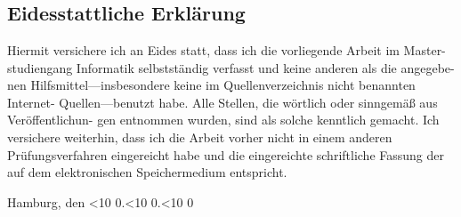 \documentclass[
    12pt,
    a4paper,
    BCOR=10mm,
    DIV=14,
    listof=totoc,
    bibliography=totoc,
    headsepline
]{scrbook}
\newcommand{\leadingzero}[1]{\ifnum #1<10 0\the#1\else\the#1\fi}
\begin{document}






\tableofcontents                  %







\printbibliography%


\begingroup
\let\cleardoublepage\clearpage

\listoffigures
\listoftables
\lstlistoflistings%

\endgroup


\begin{appendices}

\end{appendices}

\newpage

\thispagestyle{empty}

\chapter*{}

\section*{Eidesstattliche Erklärung}

Hiermit versichere ich an Eides statt, dass ich die vorliegende Arbeit im Master-
studiengang Informatik selbstständig verfasst und keine anderen als die angegebe-
nen Hilfsmittel---insbesondere keine im Quellenverzeichnis nicht benannten Internet-
Quellen---benutzt habe. Alle Stellen, die wörtlich oder sinngemäß aus Veröffentlichun-
gen entnommen wurden, sind als solche kenntlich gemacht. Ich versichere weiterhin,
dass ich die Arbeit vorher nicht in einem anderen Prüfungsverfahren eingereicht habe
und die eingereichte schriftliche Fassung der auf dem elektronischen Speichermedium
entspricht.

\bigskip
\bigskip

Hamburg, den \leadingzero{\day}.\leadingzero{\month}.\leadingzero{\year} \quad \dotfill
\end{document}

